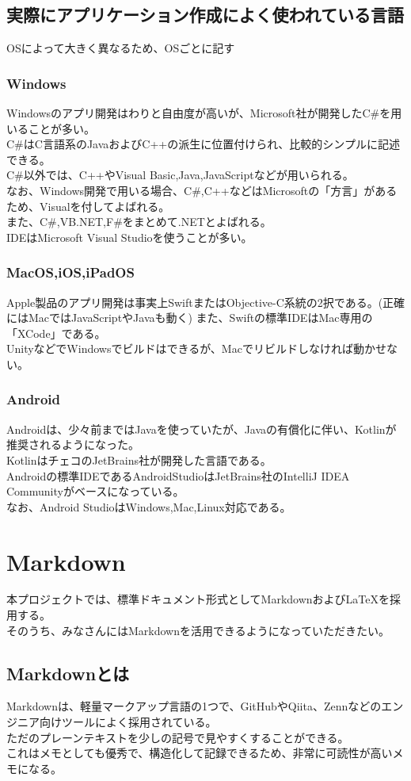 \documentclass{ltjsarticle}
\begin{document}
\subsection{実際にアプリケーション作成によく使われている言語}
OSによって大きく異なるため、OSごとに記す
\subsubsection{Windows}
Windowsのアプリ開発はわりと自由度が高いが、Microsoft社が開発したC\#を用いることが多い。\\
C\#はC言語系のJavaおよびC++の派生に位置付けられ、比較的シンプルに記述できる。\\
C\#以外では、C++やVisual Basic,Java,JavaScriptなどが用いられる。\\
なお、Windows開発で用いる場合、C\#,C++などはMicrosoftの「方言」があるため、Visualを付してよばれる。\\
また、C\#,VB.NET,F\#をまとめて.NETとよばれる。\\
IDEはMicrosoft Visual Studioを使うことが多い。
\subsubsection{MacOS,iOS,iPadOS}
Apple製品のアプリ開発は事実上SwiftまたはObjective-C系統の2択である。(正確にはMacではJavaScriptやJavaも動く)
また、Swiftの標準IDEはMac専用の「XCode」である。\\
UnityなどでWindowsでビルドはできるが、Macでリビルドしなければ動かせない。
\subsubsection{Android}
Androidは、少々前まではJavaを使っていたが、Javaの有償化に伴い、Kotlinが推奨されるようになった。\\
KotlinはチェコのJetBrains社が開発した言語である。\\
Androidの標準IDEであるAndroidStudioはJetBrains社のIntelliJ IDEA Communityがベースになっている。\\
なお、Android StudioはWindows,Mac,Linux対応である。
\section{Markdown}
本プロジェクトでは、標準ドキュメント形式としてMarkdownおよび\LaTeX を採用する。\\
そのうち、みなさんにはMarkdownを活用できるようになっていただきたい。\\
\subsection{Markdownとは}
Markdownは、軽量マークアップ言語の1つで、GitHubやQiita、Zennなどのエンジニア向けツールによく採用されている。\\
ただのプレーンテキストを少しの記号で見やすくすることができる。\\
これはメモとしても優秀で、構造化して記録できるため、非常に可読性が高いメモになる。
\end{document}
